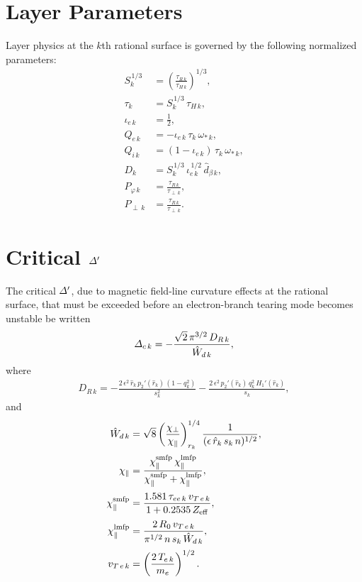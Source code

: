 \documentclass[12pt,prb,aps,notitlepage]{revtex4-1}
\begin{document}
\section{Layer Parameters}
Layer physics at the $k$th rational surface is governed by the following normalized parameters:
\begin{align}
S_k^{\,1/3} &= \left(\frac{\tau_{R\,k}}{\tau_{H\,k}}\right)^{1/3},\\[0.5ex]
\tau_k &= S_k^{\,1/3} \,\tau_{H\,k},\\[0.5ex]
\iota_{e\,k } &= \frac{1}{2},\\[0.5ex]
Q_{e\,k }&= - \iota_{e\,k}\,\tau_k\,\omega_{\ast\,k},\\[0.5ex]
Q_{i\,k }&=  (1-\iota_{e\,k})\,\tau_k\,\omega_{\ast\,k},\\[0.5ex]
D_k &= S_{k}^{\,1/3}\,\iota_{e\,k}^{\,1/2}\,\hat{d}_{\beta\,k},\\[0.5ex]
P_{\varphi\,k} &= \frac{\tau_{R\,k}}{\tau_{\perp\,k}},\\[0.5ex]
P_{\perp\,k} &= \frac{\tau_{R\,k}}{\tau_{\perp\,k}}.
\end{align}

\section{Critical ${\mit\Delta}'$}
The critical ${\mit\Delta}'$, due to magnetic field-line curvature effects at the rational surface, that must be exceeded before an
electron-branch tearing mode becomes unstable be written
\begin{align}
{\mit\Delta}_{c\,k} = - \frac{\sqrt{2}\,\pi^{3/2}\,D_{R\,k}}{\hat{W}_{d\,k}},
\end{align}
where
\begin{align}
D_{R\,k} = 
-\frac{2\,\epsilon^2\,\hat{r}_k\,p_2'(\hat{r}_k)\,(1-q_k^2)}{s_k^2}
- \frac{2\,\epsilon^2\,p_2'(\hat{r}_k)\,q_k^2\,H_1'(\hat{r}_k)}{s_k},
\end{align}
and
\begin{align}
\hat{W}_{d\,k} &= \sqrt{8}\left(\frac{\chi_\perp}{\chi_\parallel}\right)_{r_k}^{1/4}
\frac{1}{(\epsilon\,\hat{r}_k\,s_k\,n)^{1/2}},\\[0.5ex]
\chi_\parallel &= \frac{\chi_\parallel^{\rm smfp} \,\chi_\parallel^{\rm lmfp}}{\chi_\parallel^{\rm smfp}+\chi_\parallel^{\rm lmfp}},\\[0.5ex]
\chi_\parallel^{\rm smfp} &= \frac{1.581\,\tau_{ee\,k}\,v_{T\,e\,k}}{1+ 0.2535\,Z_{\rm eff}},\\[0.5ex]
\chi_\parallel^{\rm lmfp}&= \frac{2\,R_0\,v_{T\,e\,k}}{\pi^{1/2}\,n\,s_k\,\hat{W}_{d\,k}},\\[0.5ex]
v_{T\,e\,k} &= \left(\frac{2\,T_{e\,k}}{m_e}\right)^{1/2}.
\end{align}
\end{document}
